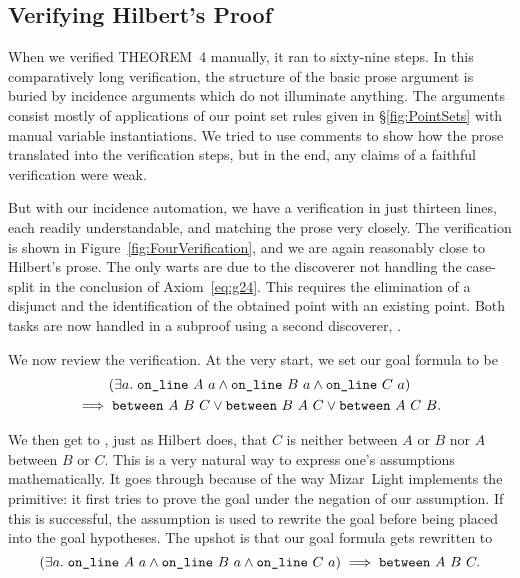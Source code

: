 \subsection{Verifying Hilbert's Proof}
When we verified THEOREM~4 manually, it ran to sixty-nine steps. In this comparatively long verification, the structure of the basic prose argument is buried by incidence arguments which do not illuminate anything. The arguments consist mostly of applications of our point set rules given in \S\ref{fig:PointSets} with manual variable instantiations. We tried to use comments to show how the prose translated into the verification steps, but in the end, any claims of a faithful verification were weak.

But with our incidence automation, we have a verification in just thirteen lines, each readily understandable, and matching the prose very closely. The verification is shown in Figure~\ref{fig:FourVerification}, and we are again reasonably close to Hilbert's prose. The only warts are due to the  discoverer not handling the case-split in the conclusion of Axiom~\ref{eq:g24}. This requires the elimination of a disjunct and the identification of the obtained point with an existing point. Both tasks are now handled in a subproof using a second discoverer, . 

We now review the verification. At the very start, we set our goal formula to be
\begin{multline*}
(\exists a.\; \code{on\_line}\ A\ a\wedge\code{on\_line}\ B\ a\wedge\code{on\_line}\ C\ a) \\\implies\between{A}{B}{C}\vee\between{B}{A}{C}\vee\between{A}{C}{B}.
\end{multline*}

We then get to , just as Hilbert does, that $C$ is neither between $A$ or $B$ nor $A$ between $B$ or $C$. This is a very natural way to express one's assumptions mathematically. It goes through because of the way Mizar~Light implements the  primitive: it first tries to prove the goal under the negation of our assumption. If this is successful, the assumption is used to rewrite the goal before being placed into the goal hypotheses. The upshot is that our goal formula gets rewritten to
\begin{displaymath}
(\exists a.\; \code{on\_line}\ A\ a\wedge\code{on\_line}\ B\ a\wedge\code{on\_line}\ C\ a) \implies\between{A}{B}{C}.
\end{displaymath}

